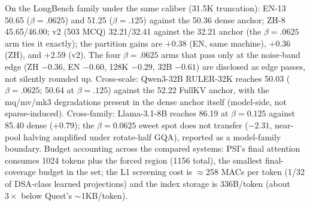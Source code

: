 \documentclass[11pt]{article}
\begin{document}
On the LongBench family under the same caliber (31.5K truncation): EN-13 50.65 ($\beta{=}.0625$) and 51.25 ($\beta{=}.125$) against the 50.36 dense anchor; ZH-8 45.65/46.00; v2 (503 MCQ) 32.21/32.41 against the 32.21 anchor (the $\beta{=}.0625$ arm ties it exactly); the partition gains are $+0.38$ (EN, same machine), $+0.36$ (ZH), and $+2.59$ (v2). The four $\beta{=}.0625$ arms that pass only at the noise-band edge (ZH $-0.36$, EN $-0.60$, 128K $-0.29$, 32B $-0.61$) are disclosed as edge passes, not silently rounded up. Cross-scale: Qwen3-32B RULER-32K reaches 50.03 ($\beta{=}.0625$; 50.64 at $\beta{=}.125$) against the 52.22 FullKV anchor, with the mq/mv/mk3 degradations present in the dense anchor itself (model-side, not sparse-induced). Cross-family: Llama-3.1-8B reaches 86.19 at $\beta{=}0.125$ against 85.40 dense ($+0.79$); the $\beta{=}0.0625$ sweet spot does not transfer ($-2.31$, near-pool halving amplified under rotate-half GQA), reported as a model-family boundary. Budget accounting across the compared systems: PSI's final attention consumes 1024 tokens plus the forced region (1156 total), the smallest final-coverage budget in the set; the L1 screening cost is $\approx$258 MACs per token (1/32 of DSA-class learned projections) and the index storage is 336B/token (about $3\times$ below Quest's $\sim$1KB/token).
\end{document}

